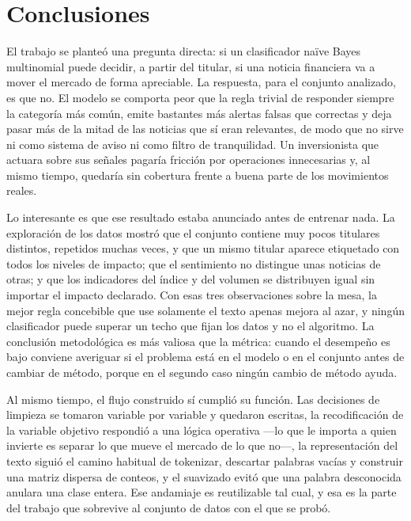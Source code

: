 \documentclass[11pt, a4paper]{article}
\begin{document}
\section{Conclusiones}

El trabajo se planteó una pregunta directa: si un clasificador naïve Bayes multinomial puede
decidir, a partir del titular, si una noticia financiera va a mover el mercado de forma apreciable.
La respuesta, para el conjunto analizado, es que no. El modelo se comporta peor que la regla
trivial de responder siempre la categoría más común, emite bastantes más alertas falsas que
correctas y deja pasar más de la mitad de las noticias que sí eran relevantes, de modo que no
sirve ni como sistema de aviso ni como filtro de tranquilidad. Un inversionista que actuara sobre
sus señales pagaría fricción por operaciones innecesarias y, al mismo tiempo, quedaría sin
cobertura frente a buena parte de los movimientos reales.

Lo interesante es que ese resultado estaba anunciado antes de entrenar nada. La exploración de los
datos mostró que el conjunto contiene muy pocos titulares distintos, repetidos muchas veces, y que
un mismo titular aparece etiquetado con todos los niveles de impacto; que el sentimiento no
distingue unas noticias de otras; y que los indicadores del índice y del volumen se distribuyen
igual sin importar el impacto declarado. Con esas tres observaciones sobre la mesa, la mejor regla
concebible que use solamente el texto apenas mejora al azar, y ningún clasificador puede superar un
techo que fijan los datos y no el algoritmo. La conclusión metodológica es más valiosa que la
métrica: cuando el desempeño es bajo conviene averiguar si el problema está en el modelo o en el
conjunto antes de cambiar de método, porque en el segundo caso ningún cambio de método ayuda.

Al mismo tiempo, el flujo construido sí cumplió su función. Las decisiones de limpieza se tomaron
variable por variable y quedaron escritas, la recodificación de la variable objetivo respondió a
una lógica operativa —lo que le importa a quien invierte es separar lo que mueve el mercado de lo
que no—, la representación del texto siguió el camino habitual de tokenizar, descartar palabras
vacías y construir una matriz dispersa de conteos, y el suavizado evitó que una palabra
desconocida anulara una clase entera. Ese andamiaje es reutilizable tal cual, y esa es la parte del
trabajo que sobrevive al conjunto de datos con el que se probó.
\end{document}
